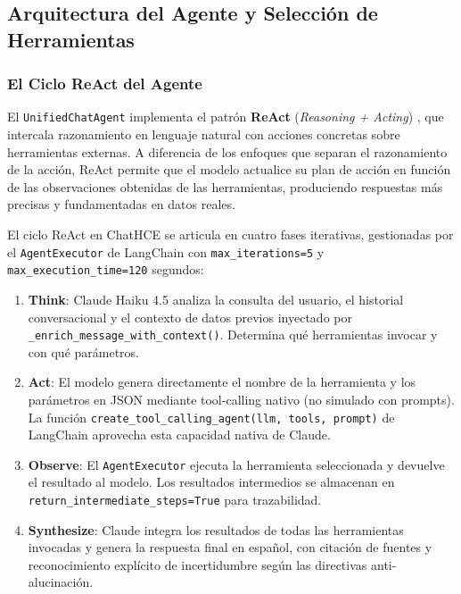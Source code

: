 \subsection{Arquitectura del Agente y Selección de Herramientas}
\label{sec:arquitectura_agente}

\subsubsection{El Ciclo ReAct del Agente}
\label{sec:react}

El \texttt{UnifiedChatAgent} implementa el patrón \textbf{ReAct} (\textit{Reasoning + Acting}) \citep{Yao2022}, que intercala razonamiento en lenguaje natural con acciones concretas sobre herramientas externas. A diferencia de los enfoques que separan el razonamiento de la acción, ReAct permite que el modelo actualice su plan de acción en función de las observaciones obtenidas de las herramientas, produciendo respuestas más precisas y fundamentadas en datos reales.

El ciclo ReAct en ChatHCE se articula en cuatro fases iterativas, gestionadas por el \texttt{AgentExecutor} de LangChain con \texttt{max\_iterations=5} y \texttt{max\_execution\_time=120} segundos:

\begin{enumerate}[nosep, leftmargin=*]
  \item \textbf{Think}: Claude Haiku 4.5 analiza la consulta del usuario, el historial conversacional y el contexto de datos previos inyectado por \texttt{\_enrich\_message\_with\_context()}. Determina qué herramientas invocar y con qué parámetros.
  \item \textbf{Act}: El modelo genera directamente el nombre de la herramienta y los parámetros en JSON mediante tool-calling nativo (no simulado con prompts). La función \texttt{create\_tool\_calling\_agent(llm, tools, prompt)} de LangChain aprovecha esta capacidad nativa de Claude.
  \item \textbf{Observe}: El \texttt{AgentExecutor} ejecuta la herramienta seleccionada y devuelve el resultado al modelo. Los resultados intermedios se almacenan en \texttt{return\_intermediate\_steps=True} para trazabilidad.
  \item \textbf{Synthesize}: Claude integra los resultados de todas las herramientas invocadas y genera la respuesta final en español, con citación de fuentes y reconocimiento explícito de incertidumbre según las directivas anti-alucinación.
\end{enumerate}

